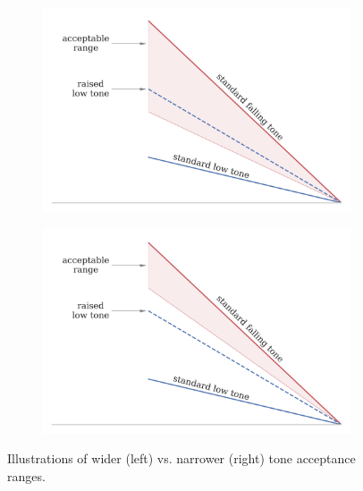 \begin{figure}[hbt!]
\centering
\begin{subfigure}[b]{.495\textwidth}
\centering
\includegraphics[width=\textwidth]{Figures/Tone_acceptance_illustration_wide.png}
\end{subfigure}
\begin{subfigure}[b]{.495\textwidth}
\centering
\includegraphics[width=\textwidth]{Figures/Tone_acceptance_illustration_narrow.png}
\end{subfigure}

\caption{Illustrations of wider (left) vs. narrower (right) tone acceptance ranges.}
\label{Figure:ToneAcceptanceIllustration}
\end{figure}
